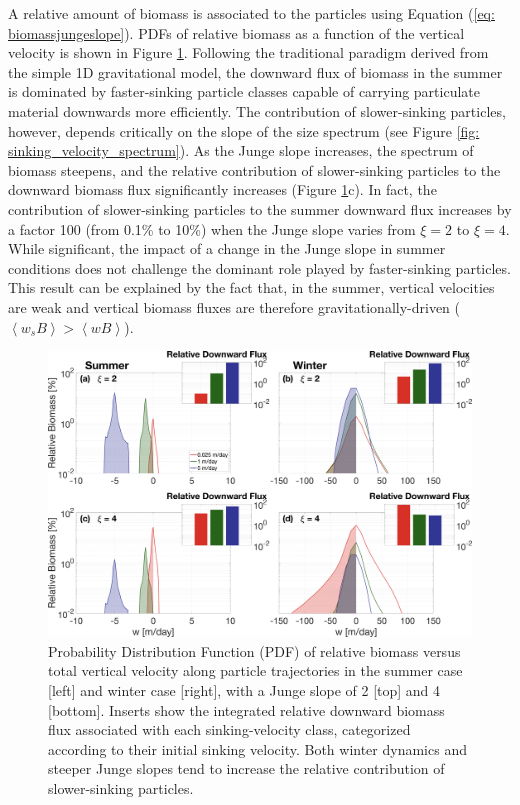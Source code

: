 \documentclass[article,linenumbers]{agujournal2018}
\begin{document}
	A relative amount of biomass is associated to the particles using Equation (\ref{eq: biomassjungeslope}). PDFs of relative biomass as a function of the vertical velocity is shown in Figure \ref{fig: biomass_export}. Following the traditional paradigm derived from the simple 1D gravitational model, the downward flux of biomass in the summer is dominated by faster-sinking particle classes capable of carrying particulate material downwards more efficiently. The contribution of slower-sinking particles, however, depends critically on the slope of the size spectrum (see Figure \ref{fig: sinking_velocity_spectrum}). As the Junge slope increases, the spectrum of biomass steepens, and the relative contribution of slower-sinking particles to the downward biomass flux significantly increases (Figure \ref{fig: biomass_export}c). In fact, the contribution of slower-sinking particles to the summer downward flux increases by a factor 100 (from 0.1\% to 10\%) when the Junge slope varies from $\xi =2$ to $\xi = 4$. While significant, the impact of a change in the Junge slope in summer conditions does not challenge the dominant role played by faster-sinking particles. This result can be explained by the fact that, in the summer, vertical velocities are weak and vertical biomass fluxes are therefore gravitationally-driven ($\left<w_sB\right> > \left<wB\right>$).
	
	\begin{figure}[t]
		\centering
		\includegraphics[width = 1\linewidth]{Fig7.png}
		\caption{Probability Distribution Function (PDF) of relative biomass versus total vertical velocity  along particle trajectories in the summer case [left] and winter case [right], with a Junge slope of 2 [top] and 4 [bottom]. Inserts show the integrated relative downward biomass flux associated with each sinking-velocity class, categorized according to their initial sinking velocity. Both winter dynamics and steeper Junge slopes tend to increase the relative contribution of slower-sinking particles.}
		\label{fig: biomass_export}
	\end{figure}
	
\end{document}
